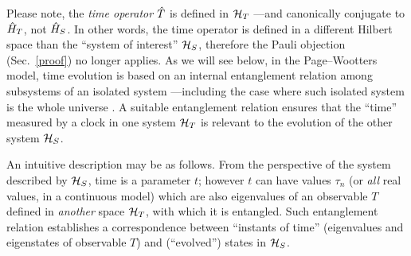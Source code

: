 Please note,
the \emph{time operator} $\hat{T}$ is defined in $\mathcal{H}_T$ ---and canonically conjugate to $\hat{H}_T$, not $\hat{H}_S$.
In other words, the time operator is defined in a different Hilbert space than the ``system of interest'' $\mathcal{H}_S$,
therefore
the Pauli objection (Sec.~\ref{proof}) no longer applies. 
As we will see below, in the Page--Wootters model, time evolution is based on an internal entanglement
relation among subsystems of an isolated system
---including the case where such isolated system is the whole universe \parencite{PageWootters}.
A suitable entanglement relation ensures that 
the ``time'' measured by a clock in one system $\mathcal{H}_T$ is relevant to the evolution of the other
system $\mathcal{H}_S$.


An intuitive description may be as follows.
From the perspective of the system described by $\mathcal{H}_S$,
time is a parameter $t$;
however $t$ can have values
$\tau_n$ (or \emph{all} real values, in a continuous model)
which are also eigenvalues of an observable $T$ defined in \emph{another} space $\mathcal{H}_T$,
with which it is entangled. Such entanglement relation establishes a correspondence
between ``instants of time'' (eigenvalues and eigenstates of observable $T$)
and (``evolved'') states in $\mathcal{H}_S$.

